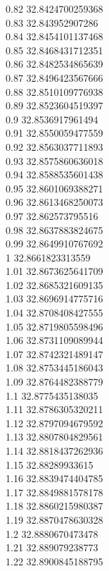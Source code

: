 {0.82	32.8424700259368\\
0.83	32.843952907286\\
0.84	32.8454101137468\\
0.85	32.8468431712351\\
0.86	32.8482534865639\\
0.87	32.8496423567666\\
0.88	32.8510109776938\\
0.89	32.8523604519397\\
0.9	32.8536917961494\\
0.91	32.8550059477559\\
0.92	32.8563037711893\\
0.93	32.8575860636018\\
0.94	32.8588535601438\\
0.95	32.8601069388271\\
0.96	32.8613468250073\\
0.97	32.862573795516\\
0.98	32.8637883824675\\
0.99	32.8649910767692\\
1	32.8661823313559\\
1.01	32.8673625641709\\
1.02	32.8685321609135\\
1.03	32.8696914775716\\
1.04	32.8708408427555\\
1.05	32.8719805598496\\
1.06	32.8731109089944\\
1.07	32.8742321489147\\
1.08	32.8753445186043\\
1.09	32.8764482388779\\
1.1	32.8775435138035\\
1.11	32.8786305320211\\
1.12	32.8797094679592\\
1.13	32.8807804829561\\
1.14	32.8818437262936\\
1.15	32.88289933615\\
1.16	32.8839474404785\\
1.17	32.8849881578178\\
1.18	32.8860215980387\\
1.19	32.8870478630328\\
1.2	32.8880670473478\\
1.21	32.889079238773\\
1.22	32.8900845188795\\
}
